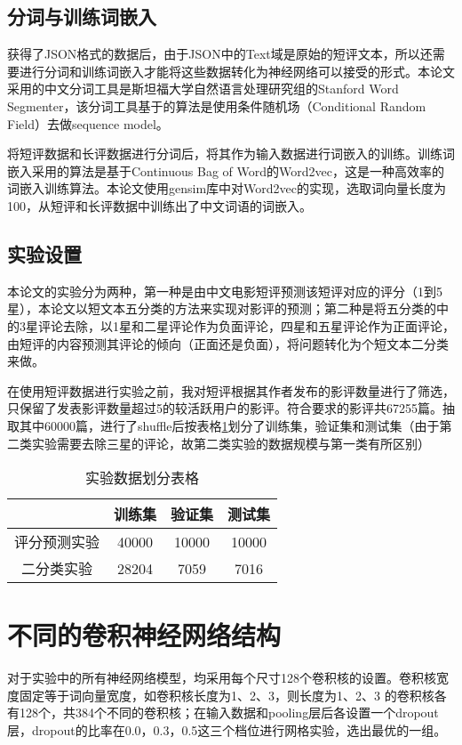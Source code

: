 \subsection{分词与训练词嵌入}
获得了JSON格式的数据后，由于JSON中的Text域是原始的短评文本，所以还需要进行分词和训练词嵌入才能将这些数据转化为神经网络可以接受的形式。本论文采用的中文分词工具是斯坦福大学自然语言处理研究组的Stanford Word Segmenter，该分词工具基于的算法是使用条件随机场（Conditional Random Field）去做sequence model。

将短评数据和长评数据进行分词后，将其作为输入数据进行词嵌入的训练。训练词嵌入采用的算法是基于Continuous Bag of Word的Word2vec，这是一种高效率的词嵌入训练算法。本论文使用gensim库中对Word2vec的实现，选取词向量长度为100，从短评和长评数据中训练出了中文词语的词嵌入。

\subsection{实验设置}
本论文的实验分为两种，第一种是由中文电影短评预测该短评对应的评分（1到5星），本论文以短文本五分类的方法来实现对影评的预测；第二种是将五分类的中的3星评论去除，以1星和二星评论作为负面评论，四星和五星评论作为正面评论，由短评的内容预测其评论的倾向（正面还是负面），将问题转化为个短文本二分类来做。

在使用短评数据进行实验之前，我对短评根据其作者发布的影评数量进行了筛选，只保留了发表影评数量超过5的较活跃用户的影评。符合要求的影评共67255篇。抽取其中60000篇，进行了shuffle后按表格\ref{tab:data divide}划分了训练集，验证集和测试集（由于第二类实验需要去除三星的评论，故第二类实验的数据规模与第一类有所区别）

\begin{table}[H]
\centering
\caption{实验数据划分表格} \label{tab:data divide}
\begin{tabular}{c|c|c|c}
    \hline
     &训练集 & 验证集 & 测试集\\
    \hline
    评分预测实验 & 40000 & 10000 & 10000\\
    \hline
    二分类实验 & 28204 & 7059 & 7016\\
    \hline
\end{tabular}
\end{table}



\section{不同的卷积神经网络结构}
对于实验中的所有神经网络模型，均采用每个尺寸128个卷积核的设置。卷积核宽度固定等于词向量宽度，如卷积核长度为1、2、3，则长度为1、2、3 的卷积核各有128个，共384个不同的卷积核；在输入数据和pooling层后各设置一个dropout层，dropout的比率在0.0，0.3，0.5这三个档位进行网格实验，选出最优的一组。

